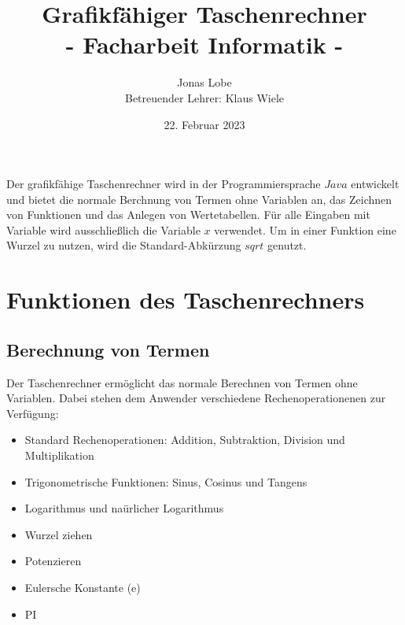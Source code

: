 \documentclass[12pt,a4paper]{article}
\begin{document}
    \setlength{\parindent}{0mm}
    \setcounter{tocdepth}{4}
    \pagestyle{plain}

    \title{\textbf{Grafikfähiger Taschenrechner} \\[5mm] \large - Facharbeit Informatik -}
    \author{Jonas Lobe \\[18cm] Betreuender Lehrer: Klaus Wiele}
    \date{22. Februar 2023}

    \maketitle
    \thispagestyle{empty}
    
    \newpage

    \tableofcontents
    \thispagestyle{empty}

    \newpage

    Der grafikfähige Taschenrechner wird in der Programmiersprache $Java$ entwickelt und bietet die normale Berchnung
    von Termen ohne Variablen an, das Zeichnen von Funktionen und das Anlegen von Wertetabellen.
    Für alle Eingaben mit Variable wird ausschließlich die Variable $x$ verwendet.
    Um in einer Funktion eine Wurzel zu nutzen, wird die Standard-Abkürzung $sqrt$ genutzt.


    \section{Funktionen des Taschenrechners}

    \subsection{Berechnung von Termen} \label{subsection:calculator}
    Der Taschenrechner ermöglicht das normale Berechnen von Termen ohne Variablen.
    Dabei stehen dem Anwender verschiedene Rechenoperationenen zur Verfügung:

    \begin{itemize}
        \item Standard Rechenoperationen: Addition, Subtraktion, Division und Multiplikation
        \item Trigonometrische Funktionen: Sinus, Cosinus und Tangens
        \item Logarithmus und naürlicher Logarithmus
        \item Wurzel ziehen
        \item Potenzieren
        \item Eulersche Konstante (e)
        \item PI
    \end{itemize}
\end{document}
